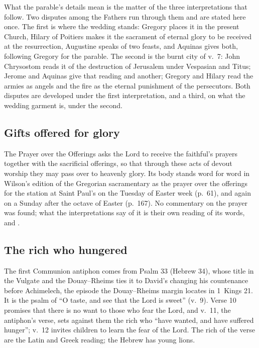 What the parable's details mean is the matter of the three interpretations
that follow. Two disputes among the Fathers run through them and are stated
here once. The first is where the wedding stands: Gregory places it in the
present Church, Hilary of Poitiers makes it the sacrament of eternal glory to
be received at the resurrection, Augustine speaks of two feasts, and Aquinas
gives both, following Gregory for the parable. The second is the burnt city of
v.~7: John Chrysostom reads it of the destruction of Jerusalem under Vespasian
and Titus; Jerome and Aquinas give that reading and another; Gregory and
Hilary read the armies as angels and the fire as the eternal punishment of the
persecutors. Both disputes are developed under the first interpretation, and a
third, on what the wedding garment is, under the second.

\subsection{Gifts offered for glory}

The Prayer over the Offerings asks the Lord to receive the faithful's prayers
together with the sacrificial offerings, so that through these acts of devout
worship they may pass over to heavenly glory. Its body stands word for word in
Wilson's edition of the Gregorian sacramentary as the prayer over the
offerings for the station at Saint Paul's on the Tuesday of Easter week
(p.~61), and again on a Sunday after the octave of Easter (p.~167). No
commentary on the prayer was found; what the
interpretations say of it is their own reading of its words,  and .

\subsection{The rich who hungered}

The first Communion antiphon comes from Psalm 33 (Hebrew 34), whose title in
the Vulgate and the Douay--Rheims ties it to David's changing his countenance
before Achimelech, the episode the Douay--Rheims margin locates in 1~Kings 21.
It is the psalm of ``O taste, and see that the Lord is sweet'' (v.~9). Verse 10
promises that there is no want to those who fear the Lord, and v.~11, the
antiphon's verse, sets against them the rich who ``have wanted, and have
suffered hunger''; v.~12 invites children to learn the fear of the Lord. The
rich of the verse are the Latin and Greek reading; the Hebrew has young lions.

